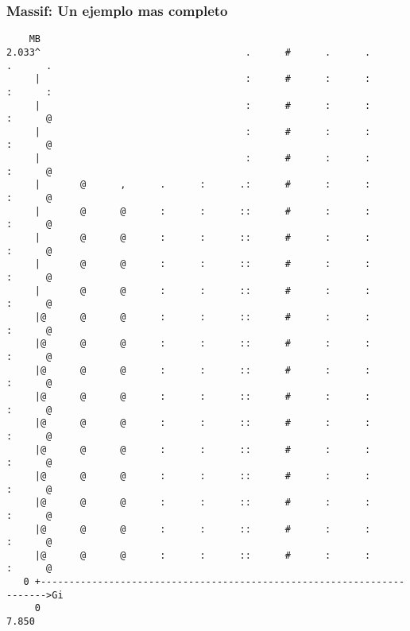 \documentclass{beamer}
\begin{document}
\begin{frame}[fragile, shrink=45]
\frametitle{Massif: Un ejemplo mas completo}
\begin{verbatim}
    MB
2.033^                                    .      #      .      .      .      .
     |                                    :      #      :      :      :      :
     |                                    :      #      :      :      :      @
     |                                    :      #      :      :      :      @
     |                                    :      #      :      :      :      @
     |       @      ,      .      :      .:      #      :      :      :      @
     |       @      @      :      :      ::      #      :      :      :      @
     |       @      @      :      :      ::      #      :      :      :      @
     |       @      @      :      :      ::      #      :      :      :      @
     |       @      @      :      :      ::      #      :      :      :      @
     |@      @      @      :      :      ::      #      :      :      :      @
     |@      @      @      :      :      ::      #      :      :      :      @
     |@      @      @      :      :      ::      #      :      :      :      @
     |@      @      @      :      :      ::      #      :      :      :      @
     |@      @      @      :      :      ::      #      :      :      :      @
     |@      @      @      :      :      ::      #      :      :      :      @
     |@      @      @      :      :      ::      #      :      :      :      @
     |@      @      @      :      :      ::      #      :      :      :      @
     |@      @      @      :      :      ::      #      :      :      :      @
     |@      @      @      :      :      ::      #      :      :      :      @
   0 +----------------------------------------------------------------------->Gi
     0                                                                   7.850
\end{verbatim}
\end{frame}
\end{document}
